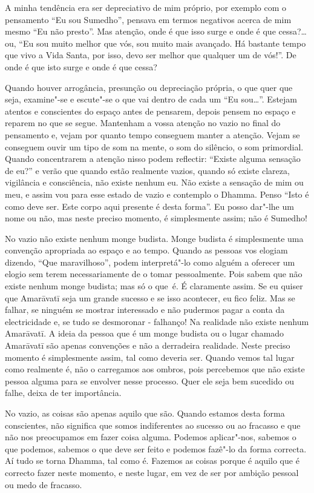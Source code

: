 A minha tendência era ser depreciativo de mim próprio, por exemplo com o
pensamento “Eu sou Sumedho”, pensava em termos negativos acerca de mim mesmo “Eu
não presto”. Mas atenção, onde é que isso surge e onde é que cessa?\ldots{} ou,
“Eu sou muito melhor que vós, sou muito mais avançado. Há bastante tempo que
vivo a Vida Santa, por isso, devo ser melhor que qualquer um de vós!”. De onde é
que isto surge e onde é que cessa?

Quando houver arrogância, presunção ou depreciação própria, o que quer que seja,
examine"-se e escute"-se o que vai dentro de cada um “Eu sou\ldots{}”. Estejam
atentos e conscientes do espaço antes de pensarem, depois pensem no espaço e
reparem no que se segue. Mantenham a vossa atenção no vazio no final do
pensamento e, vejam por quanto tempo conseguem manter a atenção. Vejam se
conseguem ouvir um tipo de som na mente, o som do silêncio, o som primordial.
Quando concentrarem a atenção nisso podem reflectir: “Existe alguma sensação de
eu?” e verão que quando estão realmente vazios, quando só existe clareza,
vigilância e consciência, não existe nenhum eu. Não existe a sensação de mim ou meu, e assim vou para esse estado de vazio e contemplo o Dhamma. Penso “Isto é como
deve ser. Este corpo aqui presente é desta forma”. Eu posso dar"-lhe um
nome ou não, mas neste preciso momento, é simplesmente assim; não é Sumedho!

No vazio não existe nenhum monge budista. Monge budista é simplesmente uma
convenção apropriada ao espaço e ao tempo. Quando as pessoas vos elogiam
dizendo, “Que maravilhoso”, podem interpretá"-lo como alguém a oferecer um elogio
sem terem necessariamente de o tomar pessoalmente. Pois sabem que não existe
nenhum monge budista; mas só o que~é. É claramente assim. Se eu quiser que
Amarāvatī seja um grande sucesso e se isso acontecer, eu fico feliz. Mas se
falhar, se ninguém se mostrar interessado e não pudermos pagar a conta da
electricidade e, se tudo se desmoronar - falhanço! Na realidade não existe
nenhum Amarāvatī. A ideia da pessoa que é um monge budista ou o lugar chamado
Amarāvatī são apenas convenções e não a derradeira realidade. Neste preciso
momento é simplesmente assim, tal como deveria ser. Quando vemos tal lugar como
realmente é, não o carregamos aos ombros, pois percebemos que não existe pessoa
alguma para se envolver nesse processo. Quer ele seja bem sucedido ou falhe, deixa de ter importância.

No vazio, as coisas são apenas aquilo que são. Quando estamos desta forma conscientes, não significa que somos indiferentes ao sucesso ou ao fracasso e que
não nos preocupamos em fazer coisa alguma. Podemos aplicar"-nos, sabemos o
que podemos, sabemos o que deve ser feito e podemos fazê"-lo da forma correcta.
Aí tudo se torna Dhamma, tal como é. Fazemos as coisas porque é aquilo que é
correcto fazer neste momento, e neste lugar, em vez de ser por ambição pessoal
ou medo de fracasso.

